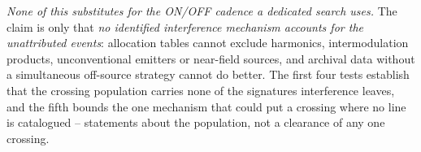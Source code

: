 \emph{None of this substitutes for the ON/OFF cadence a dedicated search
uses.} The claim is only that \emph{no
identified interference mechanism accounts for the unattributed events}:
allocation tables cannot exclude harmonics, intermodulation products,
unconventional emitters or near-field sources, and archival data without a
simultaneous off-source strategy cannot do better. The first four tests
establish that the crossing population carries none of the signatures
interference leaves, and the fifth bounds the one mechanism that could put a
crossing where no line is catalogued -- statements about the population, not
a clearance of any one crossing.

